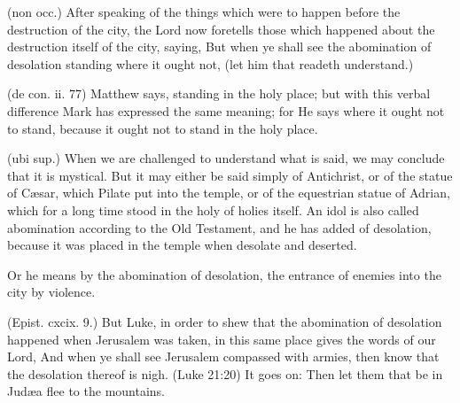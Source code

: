  

 (non occ.) After speaking of the things which were to happen before the destruction of the city, the Lord now foretells those which happened about the destruction itself of the city, saying, But when ye shall see the abomination of desolation standing where it ought not, (let him that readeth understand.)

 (de con. ii. 77) Matthew says, standing in the holy place; but with this verbal difference Mark has expressed the same meaning; for He says where it ought not to stand, because it ought not to stand in the holy place.

 (ubi sup.) When we are challenged to understand what is said, we may conclude that it is mystical. But it may either be said simply of Antichrist, or of the statue of Cæsar, which Pilate put into the temple, or of the equestrian statue of Adrian, which for a long time stood in the holy of holies itself. An idol is also called abomination according to the Old Testament, and he has added of desolation, because it was placed in the temple when desolate and deserted.

 Or he means by the abomination of desolation, the entrance of enemies into the city by violence.

 (Epist. cxcix. 9.) But Luke, in order to shew that the abomination of desolation happened when Jerusalem was taken, in this same place gives the words of our Lord, And when ye shall see Jerusalem compassed with armies, then know that the desolation thereof is nigh. (Luke 21:20) It goes on: Then let them that be in Judæa flee to the mountains.

